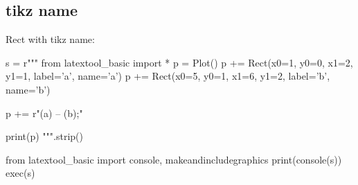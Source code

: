 \newpage
\subsection{tikz name}
Rect with tikz name:
\begin{python}
s = r"""
from latextool_basic import *
p = Plot()
p += Rect(x0=1, y0=0, x1=2, y1=1, label='a', name='a')
p += Rect(x0=5, y0=1, x1=6, y1=2, label='b', name='b')

p += r"\draw[->,line width=2] (a) -- (b);"

print(p)
""".strip()

from latextool_basic import console, makeandincludegraphics
print(console(s))
exec(s)
\end{python}
